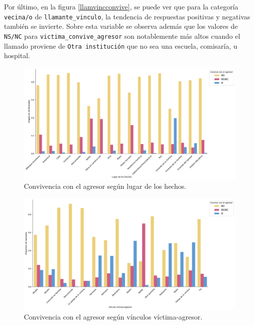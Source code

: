 \documentclass[10 pt]{article}
\begin{document}
Por último, en la figura \ref{llamvincconvive}, se puede ver que para la categoría \texttt{vecina/o} de \texttt{llamante\_vinculo}, la tendencia de respuestas positivas y negativas también se invierte. Sobre esta variable se observa además que los valores de \texttt{NS/NC} para \texttt{victima\_convive\_agresor} son notablemente más altos cuando el llamado proviene de \texttt{Otra institución} que no sea una escuela, comisaría, u hospital. 


\begin{figure}[H]
\begin{center}
\includegraphics[scale=.4]{images/latex_hecho_lugar_convive.png}
\caption{Convivencia con el agresor según lugar de los hechos.}
\label{hecholugconvive}
\end{center}
\end{figure}
    
\begin{figure}[H]
\begin{center}
\includegraphics[scale=.4]{images/convive_vinc_agresor.png}
\caption{Convivencia con el agresor según vínculos víctima-agresor.}
\label{agrvincconvive}
\end{center}
\end{figure} 
\end{document}
